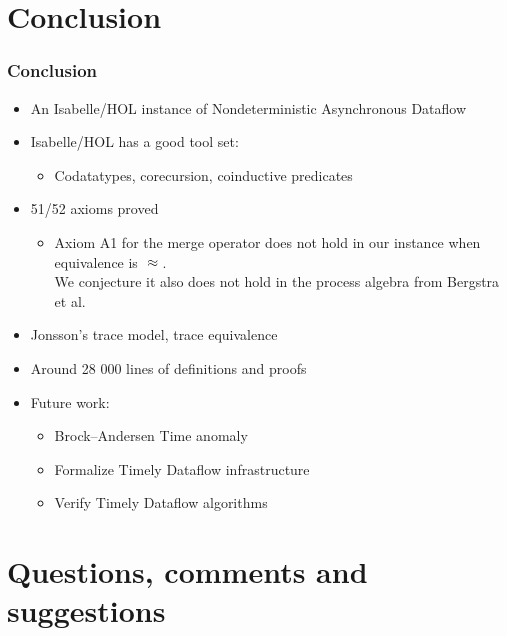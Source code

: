 \documentclass[fleqn,aspectratio=169,10pt]{beamer}
\begin{document}
\section{Conclusion}
\begin{frame}
  \frametitle{Conclusion}
  \begin{itemize}
    \item An Isabelle/HOL instance of Nondeterministic Asynchronous Dataflow
          \pause
    \item Isabelle/HOL has a good tool set:
          \begin{itemize}
            \item Codatatypes, corecursion, coinductive predicates
          \end{itemize}
          \pause
    \item 51/52 axioms proved
          \begin{itemize}
            \item Axiom A1 for the merge operator does not hold in our instance when equivalence is ${} \approx {}$. \\
                  We conjecture it also does not hold in the process algebra from Bergstra et al.
          \end{itemize}
          \pause
    \item Jonsson’s trace model, trace equivalence
          \pause
    \item Around 28 000 lines of definitions and proofs
          \pause
    \item Future work:
          \begin{itemize}
            \item Brock–Andersen Time anomaly
            \item Formalize Timely Dataflow infrastructure
            \item Verify Timely Dataflow algorithms
          \end{itemize}
  \end{itemize}
\end{frame}

\section{Questions, comments and suggestions}
\end{document}
